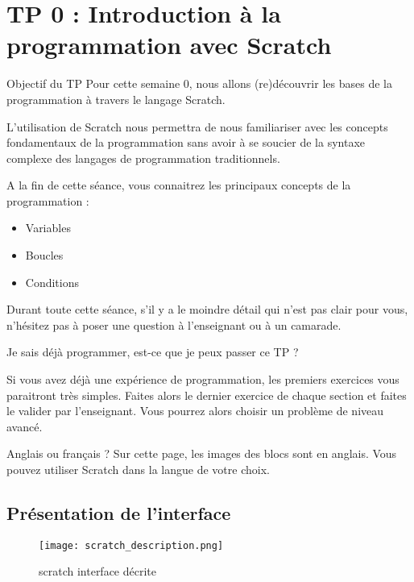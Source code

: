 \section{TP 0 : Introduction à la programmation avec Scratch}


\begin{UPSTIinfor}{Objectif du TP}
Pour cette semaine 0, nous allons (re)découvrir les bases de la programmation à travers le langage Scratch. 

L'utilisation de Scratch nous permettra de nous familiariser avec les concepts fondamentaux de la programmation sans avoir à se soucier de la syntaxe complexe des langages de programmation traditionnels.

A la fin de cette séance, vous connaitrez les principaux concepts de la programmation :
\begin{itemize}
\item Variables
\item Boucles
\item Conditions
\end{itemize}
Durant toute cette séance, s'il y a le moindre détail qui n'est pas clair pour vous, n'hésitez pas à poser une question à l'enseignant ou à un camarade.
\end{UPSTIinfor}

\begin{UPSTIidee}{Je sais déjà programmer, est-ce que je peux passer ce TP ?}

Si vous avez déjà une expérience de programmation, les premiers exercices vous paraitront très simples. Faites alors le dernier exercice de chaque section et faites le valider par l'enseignant. 
Vous pourrez alors choisir un problème de niveau avancé.
\end{UPSTIidee}

\begin{UPSTIwarning}{Anglais ou français ?}
Sur cette page, les images des blocs sont en anglais. Vous pouvez utiliser Scratch dans la langue de votre choix.
\end{UPSTIwarning}


\subsection{Présentation de l'interface}

\begin{figure}[h]
\centering
\texttt{[image: scratch\_description.png]}
\caption{scratch interface décrite}
\end{figure}

